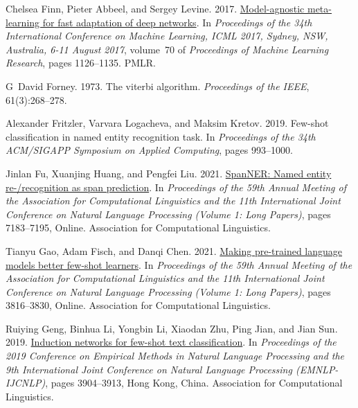 \documentclass[11pt]{article}
\begin{document}
\begin{thebibliography}{45}
Chelsea Finn, Pieter Abbeel, and Sergey Levine. 2017.
\newblock \href {http://proceedings.mlr.press/v70/finn17a.html} {Model-agnostic
  meta-learning for fast adaptation of deep networks}.
\newblock In \emph{Proceedings of the 34th International Conference on Machine
  Learning, {ICML} 2017, Sydney, NSW, Australia, 6-11 August 2017}, volume~70
  of \emph{Proceedings of Machine Learning Research}, pages 1126--1135. {PMLR}.

G~David Forney. 1973.
\newblock The viterbi algorithm.
\newblock \emph{Proceedings of the IEEE}, 61(3):268--278.

Alexander Fritzler, Varvara Logacheva, and Maksim Kretov. 2019.
\newblock Few-shot classification in named entity recognition task.
\newblock In \emph{Proceedings of the 34th ACM/SIGAPP Symposium on Applied
  Computing}, pages 993--1000.

Jinlan Fu, Xuanjing Huang, and Pengfei Liu. 2021.
\newblock \href {https://doi.org/10.18653/v1/2021.acl-long.558} {{S}pan{NER}:
  Named entity re-/recognition as span prediction}.
\newblock In \emph{Proceedings of the 59th Annual Meeting of the Association
  for Computational Linguistics and the 11th International Joint Conference on
  Natural Language Processing (Volume 1: Long Papers)}, pages 7183--7195,
  Online. Association for Computational Linguistics.

Tianyu Gao, Adam Fisch, and Danqi Chen. 2021.
\newblock \href {https://doi.org/10.18653/v1/2021.acl-long.295} {Making
  pre-trained language models better few-shot learners}.
\newblock In \emph{Proceedings of the 59th Annual Meeting of the Association
  for Computational Linguistics and the 11th International Joint Conference on
  Natural Language Processing (Volume 1: Long Papers)}, pages 3816--3830,
  Online. Association for Computational Linguistics.

Ruiying Geng, Binhua Li, Yongbin Li, Xiaodan Zhu, Ping Jian, and Jian Sun.
  2019.
\newblock \href {https://doi.org/10.18653/v1/D19-1403} {Induction networks for
  few-shot text classification}.
\newblock In \emph{Proceedings of the 2019 Conference on Empirical Methods in
  Natural Language Processing and the 9th International Joint Conference on
  Natural Language Processing (EMNLP-IJCNLP)}, pages 3904--3913, Hong Kong,
  China. Association for Computational Linguistics.


\end{thebibliography}
\end{document}
